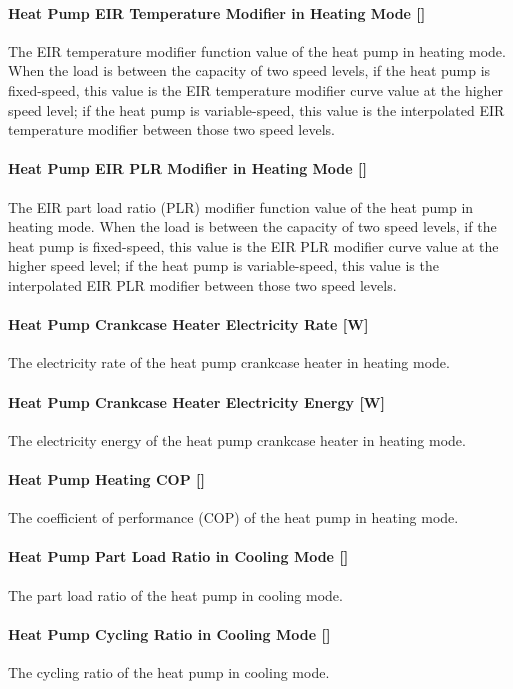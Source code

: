 \paragraph{Heat Pump EIR Temperature Modifier in Heating Mode {[}{]}}
The EIR temperature modifier function value of the heat pump in heating
mode. When the load is between the capacity of two speed levels, if the heat
pump is fixed-speed, this value is the EIR temperature modifier curve value
at the higher speed level; if the heat pump is variable-speed, this value is the
interpolated EIR temperature modifier between those two speed levels.
\paragraph{Heat Pump EIR PLR Modifier in Heating Mode {[}{]}}
The EIR part load ratio (PLR) modifier function value of the heat pump in heating
mode. When the load is between the capacity of two speed levels, if the heat
pump is fixed-speed, this value is the EIR PLR modifier curve value
at the higher speed level; if the heat pump is variable-speed, this value is the
interpolated EIR PLR modifier between those two speed levels.
\paragraph{Heat Pump Crankcase Heater Electricity Rate {[}W{]}} The electricity
rate of the heat pump crankcase heater in heating mode.
\paragraph{Heat Pump Crankcase Heater Electricity Energy {[}W{]}} The
electricity energy of the heat pump crankcase heater in heating mode.
\paragraph{Heat Pump Heating COP {[}{]}} The coefficient of performance (COP) of
the heat pump in heating mode.
\paragraph{Heat Pump Part Load Ratio in Cooling Mode {[}{]}} The part load ratio
of the heat pump in cooling mode.
\paragraph{Heat Pump Cycling Ratio in Cooling Mode {[}{]}} The cycling ratio of
the heat pump in cooling mode.
